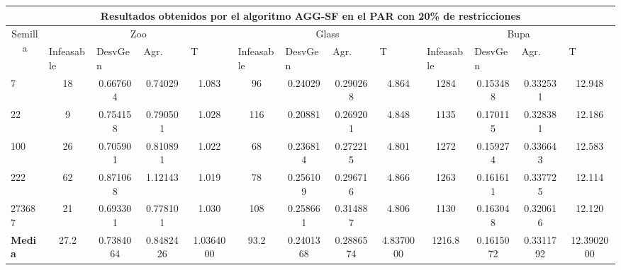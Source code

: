 \begin{table}[H]
	\tiny

	\begin{adjustwidth}{-1cm}{-1cm}%
	
	\begin{tabular}{|l|c|c|c|c|c|c|c|c|c|c|c|c|}
	\hline
	\multicolumn{13}{|c|}{\textbf{Resultados obtenidos por el algoritmo AGG-SF en el PAR con 20\% de restricciones}}                                                                                                                                                                                                                                                                                                                                            \\ \hline
	\multicolumn{1}{|c|}{\multirow{2}{*}{Semilla}} & \multicolumn{4}{c|}{Zoo}                                                                                          & \multicolumn{4}{c|}{Glass}                                                                                         & \multicolumn{4}{c|}{Bupa}                                                                                          \\ \cline{2-13} 
	\multicolumn{1}{|c|}{}                                  & \multicolumn{1}{l|}{Infeasable} & \multicolumn{1}{l|}{DesvGen} & \multicolumn{1}{l|}{Agr.} & \multicolumn{1}{l|}{T} & \multicolumn{1}{l|}{Infeasable} & \multicolumn{1}{l|}{DesvGen} & \multicolumn{1}{l|}{Agr.} & \multicolumn{1}{l|}{T} & \multicolumn{1}{l|}{Infeasable} & \multicolumn{1}{l|}{DesvGen} & \multicolumn{1}{l|}{Agr.} & \multicolumn{1}{l|}{T} \\ \hline
	7   	& 18 & 0.667604 & 0.74029 & 1.083 & 				96 & 0.24029 & 0.290268 & 4.864 &			 	1284 & 0.153488 & 0.332531 & 12.948 		\\ \hline
	22 		& 9 & 0.754158 & 0.790501 & 1.028 &				116 & 0.20881 & 0.269201 & 4.848 &		 	1135 & 0.170115 & 0.328381 &	12.186		\\ \hline
	100 	& 26 & 0.705901 & 0.810891 & 1.022 &				 68 & 0.236814 & 0.272215 & 4.801 &				1272 & 0.159274 & 0.336643 & 12.583			\\ \hline
	222 	& 62 & 0.871068 & 1.12143 &	1.019 &				78 & 0.256109 & 0.296716 & 4.866 &			1263 & 0.161611 & 0.337725 &	12.114		\\ \hline
	273687 	& 21 & 0.693301 & 0.778101 & 1.030 &				108 & 0.258661 & 0.314887 & 4.806 &				1130 & 0.163048 & 0.320616 &	12.120		\\ \hline
	\textbf{Media} &  27.2 & 	0.7384064 & 	0.8482426 & 	1.0364000 & 	93.2 & 	0.2401368 & 	0.2886574 & 	4.8370000 & 	1216.8	 & 0.1615072 & 	0.3311792	 & 12.3902000  \\ \hline
	\end{tabular}
	
	\end{adjustwidth}
	
\end{table}

